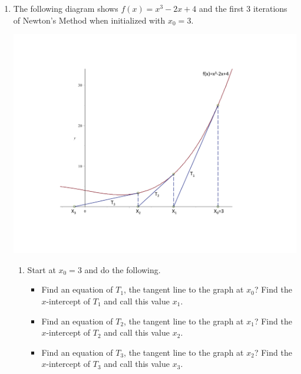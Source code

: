 \documentclass[12pt]{article}
\newif\ifans
\begin{document}
\begin{enumerate}

\item The following diagram shows $f(x)=x^3-2x+4$ and the first 3 iterations of Newton's Method when initialized with $x_0=3$.

\begin{center}
\includegraphics[scale=0.5]{newton1.pdf}
\end{center}

\begin{enumerate}

\item Start at $x_0=3$ and do the following.  

\begin{itemize}

\item Find an equation of $T_1$, the tangent line to the graph at $x_0$?  Find the $x$-intercept of $T_1$ and call this value $x_1$. 

\ifans{\fbox{$T_1: y=25x-50$. $x_1=2$}}\fi

\item Find an equation of $T_2$, the tangent line to the graph at $x_1$?  Find the $x$-intercept of $T_2$ and call this value $x_2$.

\ifans{\fbox{$T_2: y=10x-12$. $x_2=1.2$}}\fi

\item Find an equation of $T_3$, the tangent line to the graph at $x_2$?  Find the $x$-intercept of $T_3$ and call this value $x_3$.

\ifans{\fbox{$T_3: y=\frac{58}{25}x-\frac{68}{125}$. $x_3=-\frac{34}{145}\approx-.2344827586$}}\fi


\end{itemize}
\end{enumerate}
\end{enumerate}
\end{document}
